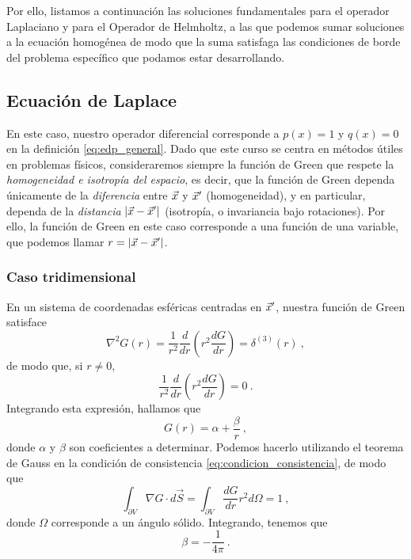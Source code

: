 Por ello, listamos a continuación las soluciones fundamentales para el operador Laplaciano y para el Operador de Helmholtz, a las que podemos sumar soluciones a la ecuación homogénea de modo que la suma satisfaga las condiciones de borde del problema específico que podamos estar desarrollando.

\subsection{Ecuación de Laplace}

En este caso, nuestro operador diferencial corresponde a $p(x) = 1$ y $q(x) = 0$ en la definición \eqref{eq:edp_general}. Dado que este curso se centra en métodos útiles en problemas físicos, consideraremos siempre la función de Green que respete la \emph{homogeneidad e isotropía del espacio}, es decir, que la función de Green dependa únicamente de la \emph{diferencia} entre $\vec{x}$ y $\vec{x}'$ (homogeneidad), y en particular, dependa de la \emph{distancia} $|\vec{x} - \vec{x}'|$ (isotropía, o invariancia bajo rotaciones). Por ello, la función de Green en este caso corresponde a una función de una variable, que podemos llamar $r = |\vec{x} - \vec{x}'|$.

\subsubsection{Caso tridimensional}

En un sistema de coordenadas esféricas centradas en $\vec{x}'$, nuestra función de Green satisface
\begin{equation}
    \nabla^2 G(r) = \frac{1}{r^2} \frac{d}{dr} \left( r^2 \frac{dG}{dr} \right) = \delta^{(3)}(r) \ ,
\end{equation}
de modo que, si $r \neq 0$, 
\begin{equation}
    \frac{1}{r^2} \frac{d}{dr} \left( r^2 \frac{dG}{dr} \right) = 0 \ .
\end{equation}
Integrando esta expresión, hallamos que
\begin{equation}
    G(r) = \alpha + \frac{\beta}{r} \ ,
\end{equation}
donde $\alpha$ y $\beta$ son coeficientes a determinar. Podemos hacerlo utilizando el teorema de Gauss en la condición de consistencia \eqref{eq:condicion_consistencia}, de modo que
\begin{equation}
    \int_{\partial V} \nabla G \cdot d\vec{S} = \int_{\partial V} \frac{dG}{dr} r^2 d\Omega = 1 \ ,
\end{equation}
donde $\Omega$ corresponde a un ángulo sólido. Integrando, tenemos que
\begin{equation}
    \beta = - \frac{1}{4\pi} \ .
\end{equation}

